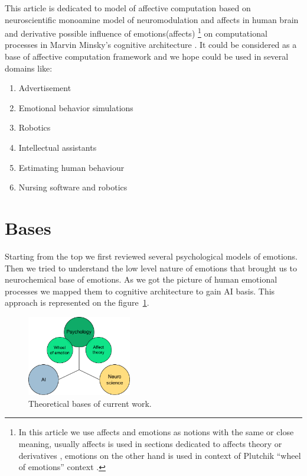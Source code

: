 This article is dedicated to model of affective computation based on neuroscientific monoamine model of neuromodulation and affects in human brain and derivative possible influence of emotions(affects) \footnote{In this article we use affects and emotions as notions with the same or close meaning, usually affects is used in sections dedicated to affects theory \cite{tomkins1, tomkins2, tomkins3} or derivatives \cite{cubeofemotions}, emotions on the other hand is used in context of Plutchik ``wheel of emotions'' context \cite{natureofemotions}.} on computational processes in Marvin Minsky's cognitive architecture \cite{emotionmachine}. It could be considered as a base of affective computation framework and we hope could be used in several domains like:

\begin{enumerate}
 \item  Advertisement
 \item  Emotional behavior simulations
 \item  Robotics
 \item  Intellectual assistants
 \item  Estimating human behaviour
 \item  Nursing software and robotics
\end{enumerate}

\section{Bases}

Starting from the top we first reviewed several psychological models of emotions. Then we tried to understand the low level nature of emotions that brought us to neurochemical base of emotions. As we got the picture of human emotional processes we mapped them to cognitive architecture to gain AI basis. This approach is represented on the figure~\ref{3_bases}.

\begin{figure}
\begin{center}
 \includegraphics[height=3.5cm]{figure1_3_bases}
\end{center}
\caption{Theoretical bases of current work.}
\label{3_bases}
\end{figure}

